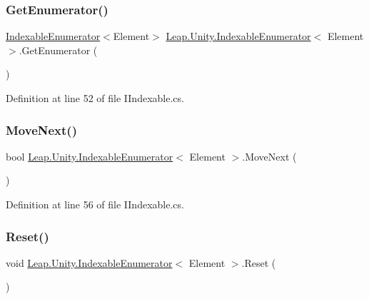 \subsubsection{\texorpdfstring{GetEnumerator()}{GetEnumerator()}}
{\footnotesize\ttfamily \mbox{\hyperlink{struct_leap_1_1_unity_1_1_indexable_enumerator}{Indexable\+Enumerator}}$<$Element$>$ \mbox{\hyperlink{struct_leap_1_1_unity_1_1_indexable_enumerator}{Leap.\+Unity.\+Indexable\+Enumerator}}$<$ Element $>$.Get\+Enumerator (\begin{DoxyParamCaption}{ }\end{DoxyParamCaption})}



Definition at line 52 of file I\+Indexable.\+cs.

\mbox{\label{struct_leap_1_1_unity_1_1_indexable_enumerator_a39829b05d9c5f09d574fa5307b61257d}} 
\subsubsection{\texorpdfstring{MoveNext()}{MoveNext()}}
{\footnotesize\ttfamily bool \mbox{\hyperlink{struct_leap_1_1_unity_1_1_indexable_enumerator}{Leap.\+Unity.\+Indexable\+Enumerator}}$<$ Element $>$.Move\+Next (\begin{DoxyParamCaption}{ }\end{DoxyParamCaption})}



Definition at line 56 of file I\+Indexable.\+cs.

\mbox{\label{struct_leap_1_1_unity_1_1_indexable_enumerator_a2f8cb0c4cc6fe8f3a7bda969602d07e1}} 
\subsubsection{\texorpdfstring{Reset()}{Reset()}}
{\footnotesize\ttfamily void \mbox{\hyperlink{struct_leap_1_1_unity_1_1_indexable_enumerator}{Leap.\+Unity.\+Indexable\+Enumerator}}$<$ Element $>$.Reset (\begin{DoxyParamCaption}{ }\end{DoxyParamCaption})}



